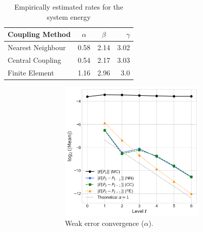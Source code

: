 \begin{table}[htbp]
    \centering
    \begin{tabular}{|l|c|c|r|}
        \hline
        \textbf{Coupling Method} & \textbf{$\alpha$} & \textbf{$\beta$} & \textbf{$\gamma$} \\
        \hline
        Nearest Neighbour & 0.58 & 2.14 & 3.02\\
        Central Coupling & 0.54 & 2.17 & 3.03 \\
        Finite Element & 1.16 & 2.96 & 3.0 \\
        \hline
    \end{tabular}
    \caption{Empirically estimated rates for the system energy}
    \label{tab:energy_decay_rates}
\end{table}

\begin{figure}[htbp]
    \centering
    \begin{subfigure}{\textwidth}
        \centering
        \begin{subfigure}[b]{0.48\textwidth}
            \centering
            \includegraphics[width=\linewidth]{graphics/she_energy_err_decay.png}
            \caption{Weak error convergence ($\alpha$).}
            \label{fig:energy_mean_decay}
        \end{subfigure}
        \hfill
        \begin{subfigure}[b]{0.48\textwidth}

\end{subfigure}
\end{subfigure}
\end{figure}
